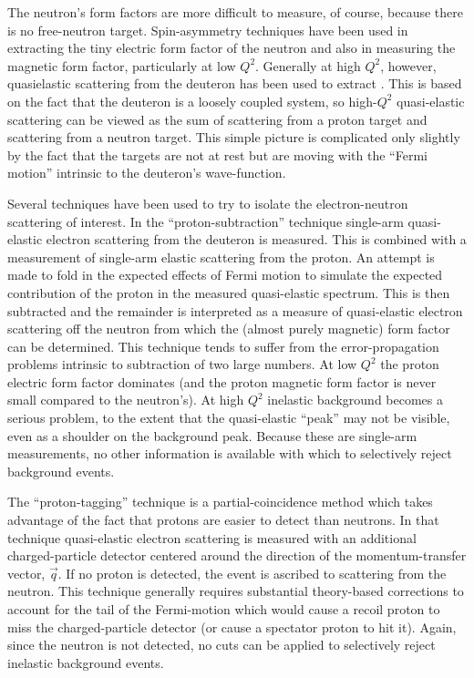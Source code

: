 \documentclass[12pt,letterpaper,oneside]{article}
\begin{document}
The neutron's form factors are more difficult to measure, of course, because there is no free-neutron target.  
Spin-asymmetry techniques have been used in extracting the tiny electric form factor of the
neutron \cite{pol1,pol2,pol3,pol4,pol5,pol6,pol7} 
and also in measuring the magnetic \cite{pol_gmn1,pol_gmn2,pol_gmn3} 
form factor, particularly at low $Q^2$.  
Generally at high $Q^2$, however, quasielastic
scattering from the deuteron has been used \cite{sub1,sub2,sub3,sub4,
SLAC_Rock,sub5,tag1,tag2,rat1,rat2,rat3,rat4,rat5,rat6,rat7,Will}
to extract \gmnc.  
This is based on the fact that the deuteron is a loosely coupled system, so
high-$Q^2$ quasi-elastic scattering can be viewed as the sum of
scattering from a proton target and scattering from a neutron target.
This simple picture is complicated only slightly by the fact that the
targets are not at rest but are moving with the ``Fermi motion''
intrinsic to the deuteron's wave-function.

Several techniques have been used to try to isolate the electron-neutron scattering of interest.  
In the ``proton-subtraction'' technique \cite{sub1,sub2,sub3,sub4,SLAC_Rock,sub5} 
single-arm quasi-elastic electron scattering from the deuteron is measured.  
This is combined with a measurement of single-arm elastic scattering from the proton.  
An attempt is made to fold in the expected effects of Fermi motion to
simulate the expected contribution of the proton in the measured quasi-elastic spectrum.  
This is then subtracted and the remainder is interpreted as a measure of quasi-elastic electron scattering off the
neutron from which the (almost purely magnetic) form factor can be determined.  
This technique tends to suffer from the error-propagation problems intrinsic to 
subtraction of two large numbers.  
At low $Q^2$ the proton electric form factor dominates (and the proton magnetic form factor is never
small compared to the neutron's).  
At high $Q^2$ inelastic background becomes a serious problem, to the extent that the quasi-elastic
``peak'' may not be visible, even as a shoulder on the background peak.  
Because these are single-arm measurements, no other information
is available with which to selectively reject background events.

The ``proton-tagging'' technique \cite{tag1,tag2} is a partial-coincidence method which takes
advantage of the fact that protons are easier to detect than neutrons.  
In that technique quasi-elastic electron scattering is
measured with an additional charged-particle detector 
centered around the direction of the momentum-transfer vector, $\vec{q}$.  
If no proton is detected, the event is ascribed to scattering from the neutron.  
This technique generally requires substantial theory-based corrections 
to account for the tail of the Fermi-motion which would cause a recoil proton to miss
the charged-particle detector (or cause a spectator proton to hit it).
Again, since the neutron is not detected, no cuts can be applied to
selectively reject inelastic background events.
\end{document}
